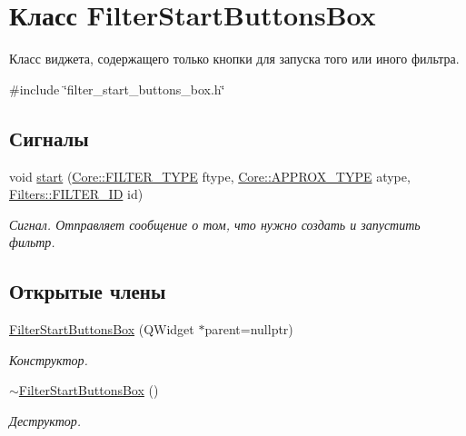 \hypertarget{class_filter_start_buttons_box}{}\section{Класс Filter\+Start\+Buttons\+Box}
\label{class_filter_start_buttons_box}


Класс виджета, содержащего только кнопки для запуска того или иного фильтра.  




{\ttfamily \#include \char`\"{}filter\+\_\+start\+\_\+buttons\+\_\+box.\+h\char`\"{}}

\subsection*{Сигналы}
\begin{DoxyCompactItemize}
\item 
void \hyperlink{class_filter_start_buttons_box_ac6e2a6555f1d388391f188f834b8e753}{start} (\hyperlink{namespace_core_af88278693f3c866f217da796f4bb9af7}{Core\+::\+F\+I\+L\+T\+E\+R\+\_\+\+T\+Y\+PE} ftype, \hyperlink{namespace_core_acd67f53ff1d9b21fabb1da4474a8f7d9}{Core\+::\+A\+P\+P\+R\+O\+X\+\_\+\+T\+Y\+PE} atype, \hyperlink{namespace_filters_a1b615faac44ef992d0af44da40ff26d7}{Filters\+::\+F\+I\+L\+T\+E\+R\+\_\+\+ID} id)
\begin{DoxyCompactList}\small\item\em Сигнал. Отправляет сообщение о том, что нужно создать и запустить фильтр. \end{DoxyCompactList}\end{DoxyCompactItemize}
\subsection*{Открытые члены}
\begin{DoxyCompactItemize}
\item 
\hypertarget{class_filter_start_buttons_box_a7e21c8886cd0f711a756b4a1f04c0989}{}\label{class_filter_start_buttons_box_a7e21c8886cd0f711a756b4a1f04c0989} 
\hyperlink{class_filter_start_buttons_box_a7e21c8886cd0f711a756b4a1f04c0989}{Filter\+Start\+Buttons\+Box} (Q\+Widget $\ast$parent=nullptr)
\begin{DoxyCompactList}\small\item\em Конструктор. \end{DoxyCompactList}\item 
\hypertarget{class_filter_start_buttons_box_a26579dc4b7375d2fc37c0693a4684057}{}\label{class_filter_start_buttons_box_a26579dc4b7375d2fc37c0693a4684057} 
\hyperlink{class_filter_start_buttons_box_a26579dc4b7375d2fc37c0693a4684057}{$\sim$\+Filter\+Start\+Buttons\+Box} ()
\begin{DoxyCompactList}\small\item\em Деструктор. \end{DoxyCompactList}\end{DoxyCompactItemize}
